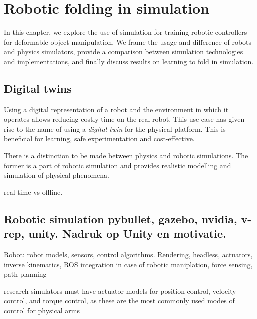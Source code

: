 \documentclass[\home/main.tex]{subfiles}
\begin{document}
\chapter{Robotic folding in simulation}\label{ch:simulation}


In this chapter, we explore the use of simulation for training robotic controllers for deformable object manipulation. We frame the usage and difference of robots and physics simulators, provide a comparison between simulation technologies and implementations, and finally discuss results on learning to fold in simulation. 

\section{Digital twins}

Using a digital representation of a robot and the environment in which it operates allows reducing costly time on the real robot. This use-case has given rise to the name of using a \emph{digital twin} for the physical platform. This is beneficial for learning, safe experimentation and cost-effective. 

There is a distinction to be made between physics and robotic simulations. The former is a part of robotic simulation and provides realistic modelling and simulation of physical phenomena. 

real-time vs offline.


\section{Robotic simulation {\tiny pybullet, gazebo, nvidia, v-rep, unity. Nadruk op Unity en motivatie.}}

Robot: robot models, sensors, control algorithms. 
Rendering, headless, actuators, inverse kinematics, ROS integration 
in case of robotic maniplation, force sensing, path planning    

research simulators must have actuator models for position control, velocity control, and torque control, as these are the most commonly used modes of control for physical arms 
\end{document}
